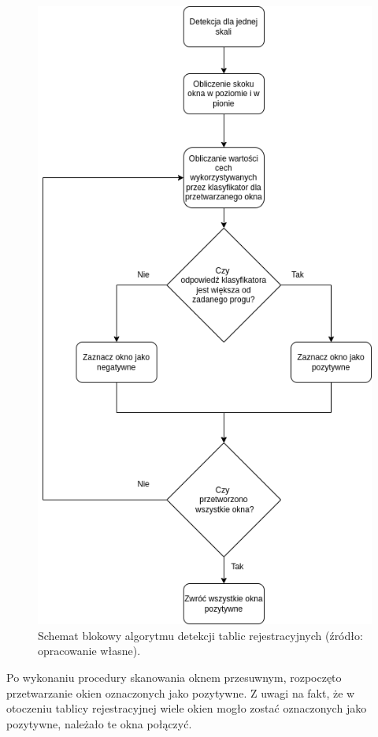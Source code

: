 \begin{figure}[!ht]
    \centering
    \includegraphics[scale=0.4]{Pictures/detection_alg}
    \caption{Schemat blokowy algorytmu detekcji tablic rejestracyjnych (źródło: opracowanie własne).}
    \label{fig:detection_alg}
\end{figure}
\FloatBarrier
Po wykonaniu procedury skanowania oknem przesuwnym, rozpoczęto przetwarzanie okien oznaczonych jako pozytywne.
Z uwagi na fakt, że w otoczeniu tablicy rejestracyjnej wiele okien mogło zostać oznaczonych jako pozytywne, należało te okna połączyć.
